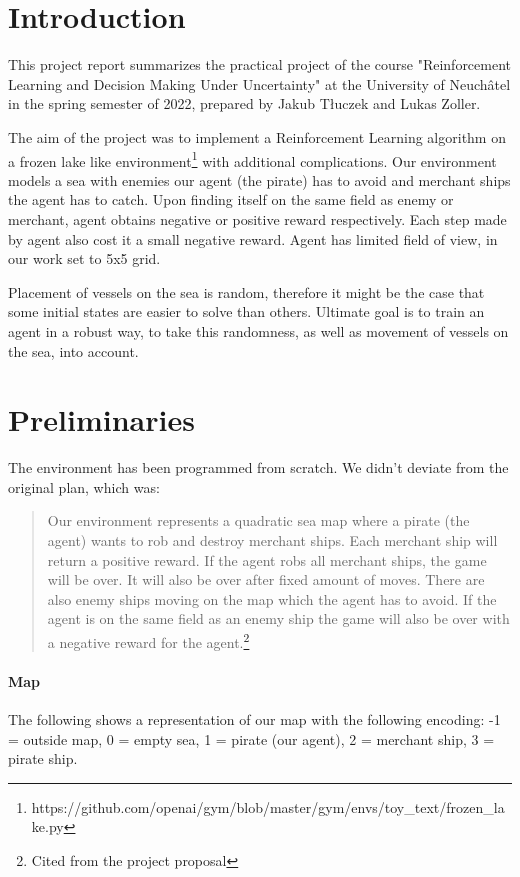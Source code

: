 \documentclass[a4paper,11pt]{article}
\theoremstyle{definition}
\begin{document}
\newpage
\pagestyle{plain}


\section{Introduction}
This project report summarizes the practical project of the course "Reinforcement Learning and Decision Making Under Uncertainty" at the University of Neuchâtel in the spring semester of 2022, prepared by Jakub Tłuczek and Lukas Zoller.

The aim of the project was to implement a Reinforcement Learning algorithm on a frozen lake like environment\footnote{https://github.com/openai/gym/blob/master/gym/envs/toy\_text/frozen\_lake.py} with additional complications. Our environment models a sea with enemies our agent (the pirate) has to avoid and merchant ships the agent has to catch. Upon finding itself on the same field as enemy or merchant, agent obtains negative or positive reward respectively. Each step made by agent also cost it a small negative reward. Agent has limited field of view, in our work set to 5x5 grid.

Placement of vessels on the sea is random, therefore it might be the case that some initial states are easier to solve than others. Ultimate goal is to train an agent in a robust way, to take this randomness, as well as movement of vessels on the sea, into account.

\section{Preliminaries}
The environment has been programmed from scratch. We didn't deviate from the original plan, which was:


\begin{quote}
Our environment represents a quadratic sea map where a pirate (the agent) wants to rob and destroy merchant ships. Each merchant ship will return a positive reward. If the agent robs all merchant ships, the game will be over. It will also be over after fixed amount of moves. There are also enemy ships moving on the map which the agent has to avoid. If the agent is on the same field as an enemy ship the game will also be over with a negative reward for the agent.\footnote{Cited from the project proposal}
\end{quote}

\clearpage

\paragraph{Map}
The following shows a representation of our map with the following encoding: -1 = outside map, 0 = empty sea, 1 = pirate (our agent), 2 = merchant ship, 3 = pirate ship.
\end{document}
